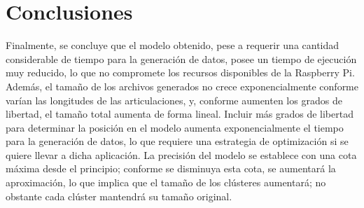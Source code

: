 \section{Conclusiones}

Finalmente, se concluye que el modelo obtenido, pese a requerir una cantidad considerable de tiempo para la generación de datos, posee un tiempo de ejecución muy reducido, lo que no compromete los recursos disponibles de la Raspberry Pi. Además, el tamaño de los archivos generados no crece exponencialmente conforme varían las longitudes de las articulaciones, y, conforme aumenten los grados de libertad, el tamaño total aumenta de forma lineal. Incluir más grados de libertad para determinar la posición en el modelo aumenta exponencialmente el tiempo para la generación de datos, lo que requiere una estrategia de optimización si se quiere llevar a dicha aplicación. La precisión del modelo se establece con una cota máxima desde el principio; conforme se disminuya esta cota, se aumentará la aproximación, lo que implica que el tamaño de los clústeres aumentará; no obstante cada clúster mantendrá su tamaño original.